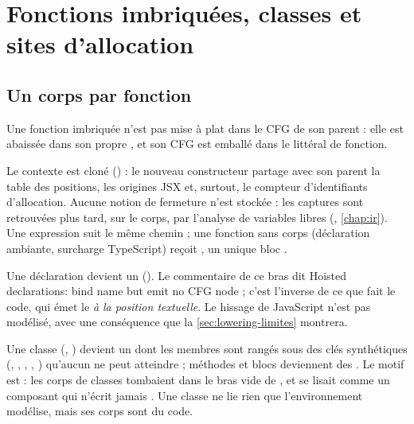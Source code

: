 \section{Fonctions imbriquées, classes et sites d'allocation}
\label{sec:lowering-sites}

\subsection{Un corps par fonction}

Une fonction imbriquée n'est pas \og mise à plat\fg{} dans le CFG de son parent : elle est abaissée dans son propre , et son CFG est emballé dans le littéral de fonction.


Le contexte est cloné () : le nouveau constructeur partage avec son parent la table des positions, les origines JSX et, surtout, le compteur d'identifiants d'allocation. Aucune notion de fermeture n'est stockée : les captures sont retrouvées plus tard, sur le corps, par l'analyse de variables libres (, \cref{chap:ir}). Une  expression suit le même chemin ; une fonction sans corps (déclaration ambiante, surcharge TypeScript) reçoit , un unique bloc .

Une déclaration  devient un  (). Le commentaire de ce bras dit \og Hoisted declarations: bind name but emit no CFG node\fg{} ; c'est l'inverse de ce que fait le code, qui émet le  \emph{à la position textuelle}. Le hissage de JavaScript n'est pas modélisé, avec une conséquence que la \cref{sec:lowering-limites} montrera.

Une classe (, ) devient un  dont les membres sont rangés sous des clés synthétiques (, , , , ) qu'aucun  ne peut atteindre ; méthodes et blocs  deviennent des . Le motif est  : les corps de classes tombaient dans le bras vide de , et  se lisait comme un composant qui n'écrit jamais . Une classe ne lie rien que l'environnement modélise, mais ses corps sont du code.


